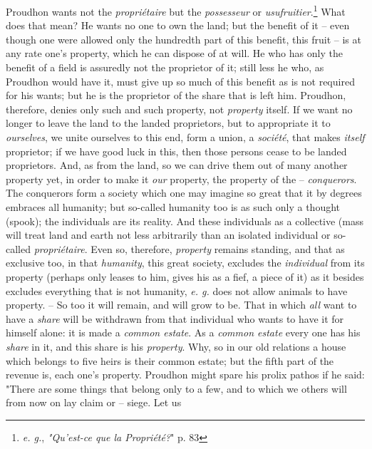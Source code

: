 Proudhon wants not the \textit{propri\'etaire} but the \textit{possesseur} or 
\textit{usufruitier}.\footnote{\textit{e. g.}, \textit{"{}Qu'est-ce que la 
Propri\'et\'e?}"{} p. 83} What does that mean? He wants no one to own the 
land; but the benefit of it -- even though one were allowed only the hundredth 
part of this benefit, this fruit -- is at any rate one's property, which he 
can dispose of at will. He who has only the benefit of a field is assuredly 
not the proprietor of it; still less he who, as Proudhon would have it, must 
give up so much of this benefit as is not required for his wants; but he is 
the proprietor of the share that is left him. Proudhon, therefore, denies only 
such and such property, not \textit{property} itself. If we want no longer to 
leave the land to the landed proprietors, but to appropriate it to 
\textit{ourselves}, we unite ourselves to this end, form a union, a 
\textit{soci\'et\'e}, that makes \textit{itself} proprietor; if we have good 
luck in this, then those persons cease to be landed proprietors. And, as from 
the land, so we can drive them out of many another property yet, in order to 
make it \textit{our} property, the property of the -- \textit{conquerors}. The 
conquerors form a society which one may imagine so great that it by degrees 
embraces all humanity; but so-called humanity too is as such only a thought 
(spook); the individuals are its reality. And these individuals as a 
collective (mass will treat land and earth not less arbitrarily than an 
isolated individual or so-called \textit{propri\'etaire}. Even so, therefore, 
\textit{property} remains standing, and that as exclusive too, in that 
\textit{humanity}, this great society, excludes the \textit{individual} from 
its property (perhaps only leases to him, gives his as a fief, a piece of it) 
as it besides excludes everything that is not humanity, \textit{e. g.} does 
not allow animals to have property. -- So too it will remain, and will grow to 
be. That in which \textit{all} want to have a \textit{share} will be withdrawn 
from that individual who wants to have it for himself alone: it is made a 
\textit{common estate}. As a \textit{common estate} every one has his 
\textit{share} in it, and this share is his \textit{property}. Why, so in our 
old relations a house which belongs to five heirs is their common estate; but 
the fifth part of the revenue is, each one's property. Proudhon might spare 
his prolix pathos if he said: "{}There are some things that belong only to a 
few, and to which we others will from now on lay claim or -- siege. Let us 
